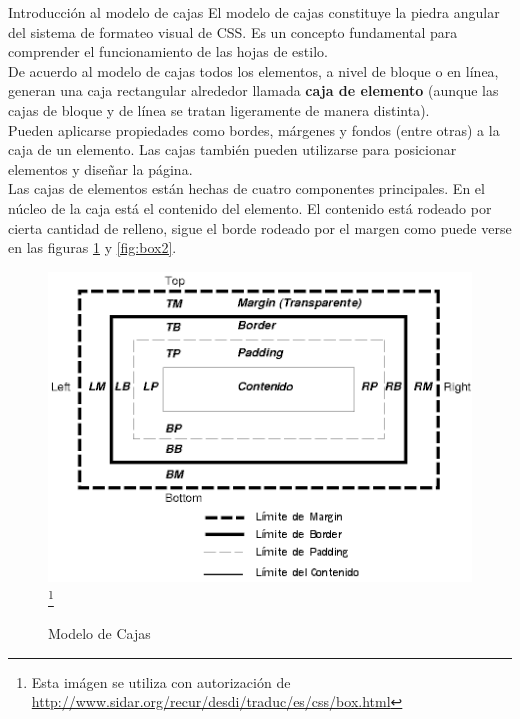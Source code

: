 \begin{frame}{Introducción al modelo de cajas} %
    El modelo de cajas constituye la piedra angular del sistema de formateo
    visual de CSS. Es un concepto fundamental para comprender el funcionamiento
    de las hojas de estilo.  \\[0.5cm]

    De acuerdo al modelo de cajas todos los elementos, a nivel de bloque o en
    línea, generan una caja rectangular alrededor llamada \textbf{caja de
    elemento} (aunque las cajas de bloque y de línea se tratan ligeramente de
    manera distinta). \\[0.5cm]

    Pueden aplicarse propiedades como bordes, márgenes y fondos (entre otras) a
    la caja de un elemento. Las cajas también pueden utilizarse para posicionar
    elementos y diseñar la página.\\[0.5cm]

    Las cajas de elementos están hechas de cuatro componentes principales. En
    el núcleo de la caja está el contenido del elemento. El contenido está
    rodeado por cierta cantidad de relleno, sigue el borde rodeado por el
    margen como puede verse en las figuras \ref{fig:box1} y \ref{fig:box2}.

    \begin{figure}
        \caption{Modelo de Cajas}
        \label{fig:box1}
        \centering
        \includegraphics[scale=0.55]{imgs/boxmodel1.png}\footnote{Esta imágen se
        utiliza con autorización de \url{http://www.sidar.org/recur/desdi/traduc/es/css/box.html}}
    \end{figure}
    

\end{frame}
